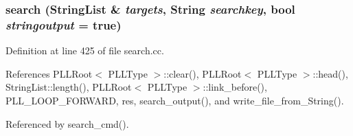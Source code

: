 \subsubsection{ search ({\bf String\-List} \& {\em targets}, {\bf String} {\em searchkey}, bool {\em stringoutput} = {\bf true})}\label{dil2al_8hh_a362}




Definition at line 425 of file search.cc.

References PLLRoot$<$ PLLType $>$::clear(), PLLRoot$<$ PLLType $>$::head(), String\-List::length(), PLLRoot$<$ PLLType $>$::link\_\-before(), PLL\_\-LOOP\_\-FORWARD, res, search\_\-output(), and write\_\-file\_\-from\_\-String().

Referenced by search\_\-cmd().



